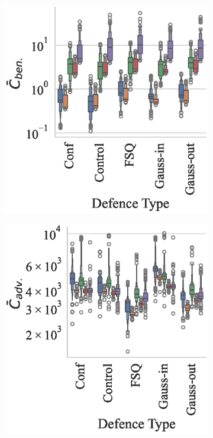\begin{figure}
    \centering
    \begin{subfigure}[]{.3\textwidth}
        \centering
        \includegraphics[width=\textwidth]{cifar_ben_failures_per_train_time_vs_defence_type.eps}
    \end{subfigure}
    \begin{subfigure}[]{0.3\textwidth}
        \includegraphics[width=\textwidth]{cifar_adv_failures_per_train_time_vs_defence_type.eps}

\end{subfigure}
\end{figure}
